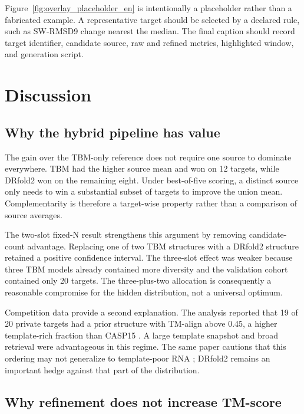 \documentclass[12pt,a4paper,oneside]{report}
\begin{document}
Figure~\ref{fig:overlay_placeholder_en} is intentionally a placeholder rather than a
fabricated example. A representative target should be selected by a declared rule, such
as SW-RMSD9 change nearest the median. The final caption should record target identifier,
candidate source, raw and refined metrics, highlighted window, and generation script.

\chapter{Discussion}
\label{chap:discussion_en}

\section{Why the hybrid pipeline has value}

The gain over the TBM-only reference does not require one source to dominate everywhere.
TBM had the higher source mean and won on 12 targets, while DRfold2 won on the remaining
eight. Under best-of-five scoring, a distinct source only needs to win a substantial
subset of targets to improve the union mean. Complementarity is therefore a target-wise
property rather than a comparison of source averages.

The two-slot fixed-N result strengthens this argument by removing candidate-count
advantage. Replacing one of two TBM structures with a DRfold2 structure retained a
positive confidence interval. The three-slot effect was weaker because three TBM models
already contained more diversity and the validation cohort contained only 20 targets.
The three-plus-two allocation is consequently a reasonable compromise for the hidden
distribution, not a universal optimum.

Competition data provide a second explanation. The analysis reported that 19 of 20
private targets had a prior structure with TM-align above 0.45, a higher template-rich
fraction than CASP15 \cite{competition_paper}. A large template snapshot and broad
retrieval were advantageous in this regime. The same paper cautions that this ordering
may not generalize to template-poor RNA \cite{competition_paper}; DRfold2 remains an
important hedge against that part of the distribution.

\section{Why refinement does not increase TM-score}
\end{document}
